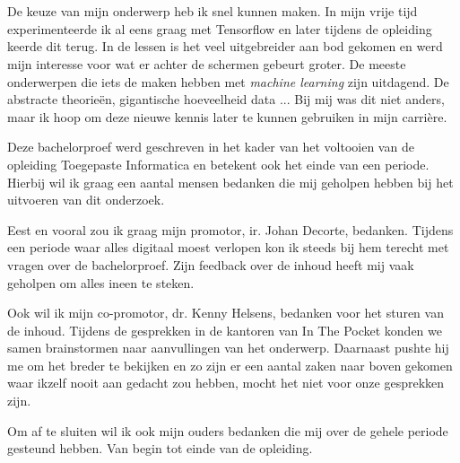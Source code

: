 
\chapter*{}
\label{ch:voorwoord}


De keuze van mijn onderwerp heb ik snel kunnen maken. In mijn vrije tijd experimenteerde ik al eens graag met Tensorflow en later tijdens de opleiding keerde dit terug. In de lessen is het veel uitgebreider aan bod gekomen en werd mijn interesse voor wat er achter de schermen gebeurt groter. De meeste onderwerpen die iets de maken hebben met \textit{machine learning} zijn uitdagend. De abstracte theorieën, gigantische hoeveelheid data ... Bij mij was dit niet anders, maar ik hoop om deze nieuwe kennis later te kunnen gebruiken in mijn carrière.

Deze bachelorproef werd geschreven in het kader van het voltooien van de opleiding Toegepaste Informatica en betekent ook het einde van een periode. Hierbij wil ik graag een aantal mensen bedanken die mij geholpen hebben bij het uitvoeren van dit onderzoek.

Eest en vooral zou ik graag mijn promotor, ir. Johan Decorte, bedanken. Tijdens een periode waar alles digitaal moest verlopen kon ik steeds bij hem terecht met vragen over de bachelorproef. Zijn feedback over de inhoud heeft mij vaak geholpen om alles ineen te steken.

Ook wil ik mijn co-promotor, dr. Kenny Helsens, bedanken voor het sturen van de inhoud. Tijdens de gesprekken in de kantoren van In The Pocket konden we samen brainstormen naar aanvullingen van het onderwerp. Daarnaast pushte hij me om het breder te bekijken en zo zijn er een aantal zaken naar boven gekomen waar ikzelf nooit aan gedacht zou hebben, mocht het niet voor onze gesprekken zijn.

Om af te sluiten wil ik ook mijn ouders bedanken die mij over de gehele periode gesteund hebben. Van begin tot einde van de opleiding.